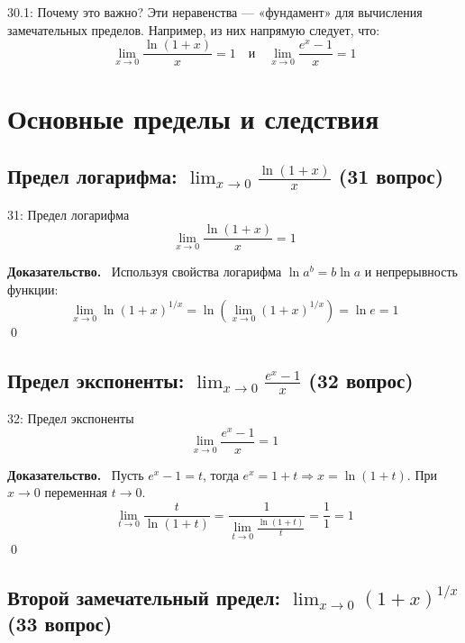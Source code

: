 \documentclass[a4paper,12pt]{article}
\newcommand{\tsubsection}[2]{\subsection[#1]{\texorpdfstring{#2}{#1}}}
\newcommand{\myproof}{\textbf{Доказательство.}\ }
\begin{document}
	
	
	\vspace{0.5cm}
	\begin{notebook}{30.1: Почему это важно?}
		Эти неравенства — «фундамент» для вычисления замечательных пределов. Например, из них напрямую следует, что:
		\[ \lim_{x \to 0} \frac{\ln(1+x)}{x} = 1 \quad \text{и} \quad \lim_{x \to 0} \frac{e^x - 1}{x} = 1 \]
	\end{notebook}
	
	
	
	
	
	
	
	
	\newpage
	\section{Основные пределы и следствия}
	
	\tsubsection{Предел логарифма (31 вопрос)}{Предел логарифма: $\lim_{x \rightarrow 0} \frac{\ln (1+x)}{x}$ (31 вопрос)}
	
	\begin{theorembox}{31: Предел логарифма}
		\[ \lim_{x \rightarrow 0} \frac{\ln (1+x)}{x} = 1 \]
	\end{theorembox}
	
	\myproof
	Используя свойства логарифма $\ln a^b = b \ln a$ и непрерывность функции:
	\[ \lim_{x \rightarrow 0} \ln(1+x)^{1/x} = \ln \left( \lim_{x \rightarrow 0} (1+x)^{1/x} \right) = \ln e = 1 \] \qed
	
	
	\vspace{1cm}
	\tsubsection{Предел экспоненты (32 вопрос)}{Предел экспоненты: $\lim_{x \rightarrow 0} \frac{e^x - 1}{x}$ (32 вопрос)}
	
	\begin{theorembox}{32: Предел экспоненты}
		\[ \lim_{x \rightarrow 0} \frac{e^x - 1}{x} = 1 \]
	\end{theorembox}
	
	\myproof
	Пусть $e^x - 1 = t$, тогда $e^x = 1 + t \Rightarrow x = \ln(1+t)$.
	При $x \rightarrow 0$ переменная $t \rightarrow 0$.
	\[ \lim_{t \rightarrow 0} \frac{t}{\ln(1+t)} = \frac{1}{\lim_{t \rightarrow 0} \frac{\ln(1+t)}{t}} = \frac{1}{1} = 1 \] \qed
	
	
	
	\vspace{1cm}
	\tsubsection{Второй замечательный предел (33 вопрос)}{Второй замечательный предел: $\lim_{x \rightarrow 0} (1+x)^{1/x}$ (33 вопрос)}
	
\end{document}
